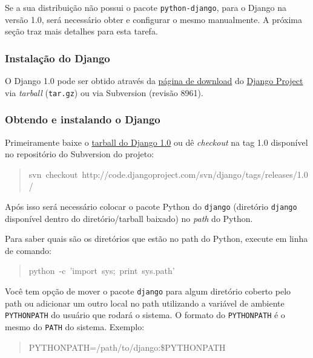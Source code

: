 Se a sua distribuição não possui o pacote \texttt{python-django}, para
o Django na versão 1.0, será necessário obter e configurar o mesmo
manualmente. A próxima seção traz mais detalhes para esta tarefa.



\hypertarget{instala-o-do-django}{}
\subsubsection*{Instalação do Django}

O Django 1.0 pode ser obtido através da \href{http://www.djangoproject.com/download/}{página de download} do \href{http://www.djangoproject.com}{Django Project} via \emph{tarball} (\texttt{tar.gz}) ou via
Subversion (revisão 8961).



\hypertarget{obtendo-e-instalando-o-django}{}
\subsubsection*{Obtendo e instalando o Django}

Primeiramente baixe o \href{http://www.djangoproject.com/download/1.0/tarball/}{tarball do Django 1.0} ou dê
\emph{checkout} na tag 1.0 disponível no repositório do Subversion do
projeto:
\begin{quote}{\ttfamily \raggedright \noindent
svn~checkout~http://code.djangoproject.com/svn/django/tags/releases/1.0/
}\end{quote}

Após isso será necessário colocar o pacote Python do \texttt{django}
(diretório \texttt{django} disponível dentro do diretório/tarball baixado)
no \emph{path} do Python.

Para saber quais são os diretórios que estão no path do Python,
execute em linha de comando:
\begin{quote}{\ttfamily \raggedright \noindent
python~-c~'import~sys;~print~sys.path'
}\end{quote}

Você tem opção de mover o pacote \texttt{django} para algum diretório
coberto pelo path ou adicionar um outro local no path utilizando a
variável de ambiente \texttt{PYTHONPATH} do usuário que rodará o sistema. O
formato do \texttt{PYTHONPATH} é o mesmo do \texttt{PATH} do sistema. Exemplo:
\begin{quote}{\ttfamily \raggedright \noindent
PYTHONPATH=/path/to/django:{\$}PYTHONPATH
}\end{quote}


